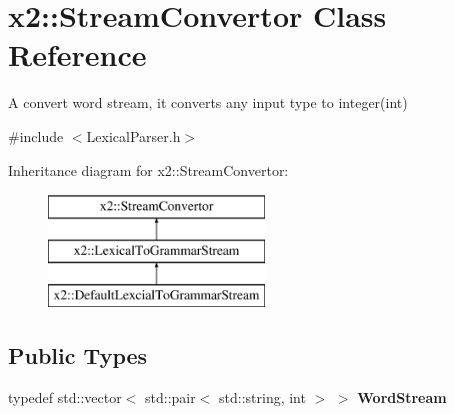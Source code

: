 \hypertarget{classx2_1_1_stream_convertor}{}\section{x2\+:\+:Stream\+Convertor Class Reference}
\label{classx2_1_1_stream_convertor}


A convert word stream, it converts any input type to integer(int)  




{\ttfamily \#include $<$Lexical\+Parser.\+h$>$}

Inheritance diagram for x2\+:\+:Stream\+Convertor\+:\begin{figure}[H]
\begin{center}
\leavevmode
\includegraphics[height=3.000000cm]{classx2_1_1_stream_convertor}
\end{center}
\end{figure}
\subsection*{Public Types}
\begin{DoxyCompactItemize}
\item 
\mbox{\label{classx2_1_1_stream_convertor_a1aad435b98906735d193f2dddaafcbde}} 
typedef std\+::vector$<$ std\+::pair$<$ std\+::string, int $>$ $>$ {\bfseries Word\+Stream}
\end{DoxyCompactItemize}
